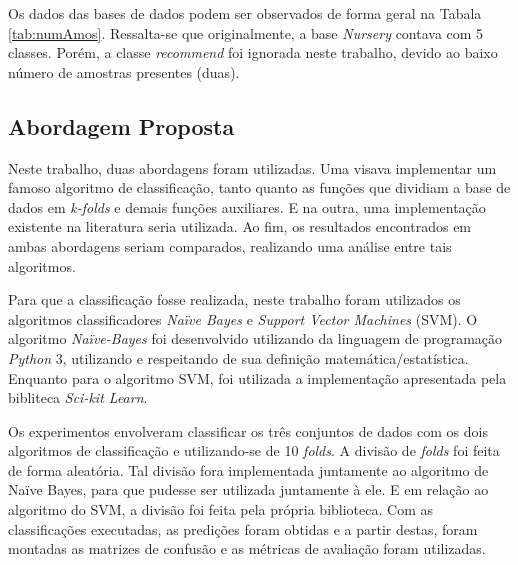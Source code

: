 \documentclass[12pt]{article}
\begin{document}
        Os dados das bases de dados podem ser observados de forma geral na Tabala \ref{tab:numAmos}. Ressalta-se que originalmente, a base \textit{Nursery} contava com 5 classes. Porém, a classe \textit{recommend} foi ignorada neste trabalho, devido ao baixo número de amostras presentes (duas).
        
        \begin{table}[h]
            \centering
            \caption{Quantidade de amostras, atributos e classes apresentadas para cada uma das bases de dados utilizadas neste trabalho.}
            \label{tab:numAmos}
        \end{table}
    
    \subsection{Abordagem Proposta}
        Neste trabalho, duas abordagens foram utilizadas. Uma visava implementar um famoso algoritmo de classificação, tanto quanto as funções que dividiam a base de dados em \textit{k-folds} e demais funções auxiliares. E na outra, uma implementação existente na literatura seria utilizada. Ao fim, os resultados encontrados em ambas abordagens seriam comparados, realizando uma análise entre tais algoritmos. 
    
        Para que a classificação fosse realizada, neste trabalho foram utilizados os algoritmos classificadores \textit{Naïve Bayes} e \textit{Support Vector Machines} (SVM). O algoritmo \textit{Naïve-Bayes} foi desenvolvido utilizando da linguagem de programação \textit{Python} 3, utilizando e respeitando de sua definição matemática/estatística. Enquanto para o algoritmo SVM, foi utilizada a implementação apresentada pela bibliteca \textit{Sci-kit Learn}.
        
        Os experimentos envolveram classificar os três conjuntos de dados com os dois algoritmos de classificação e utilizando-se de 10 \textit{folds}. A divisão de \textit{folds} foi feita de forma aleatória. Tal divisão fora implementada juntamente ao algoritmo de Naïve Bayes, para que pudesse ser utilizada juntamente à ele. E em relação ao algoritmo do SVM, a divisão foi feita pela própria biblioteca. Com as classificações executadas, as predições foram obtidas  e a partir destas, foram montadas as matrizes de confusão e as métricas de avaliação foram utilizadas.
\end{document}
